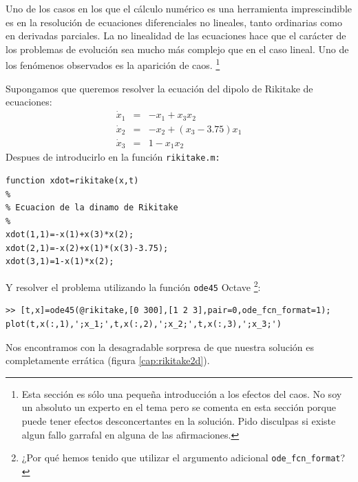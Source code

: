 Uno de los casos en los que el cálculo numérico es una herramienta
imprescindible es en la resolución de ecuaciones diferenciales no
lineales, tanto ordinarias como en derivadas parciales. La no
linealidad de las ecuaciones hace que el carácter de los problemas de
evolución sea mucho más complejo que en el caso lineal. Uno de los
fenómenos observados es la aparición de caos.%
\footnote{Esta sección es sólo una pequeña introducción a los efectos
  del caos.  No soy un absoluto un experto en el tema pero se comenta
  en esta sección porque puede tener efectos desconcertantes en la
  solución. Pido disculpas si existe algun fallo garrafal en alguna de
  las afirmaciones.%
}

Supongamos que queremos resolver la ecuación del dipolo de
Rikitake de ecuaciones:$$
\begin{array}{ccl}
  \dot x_{1} & = & -x_{1}+x_{3}x_{2}\\
  \dot x_{2} & = & -x_{2}+(x_{3}-3.75)x_{1}\\
  \dot x_{3} & = & 1-x_{1}x_{2}\end{array}$$
Despues de introducirlo en la función \texttt{rikitake.m:}

\begin{verbatim}
function xdot=rikitake(x,t)
%
% Ecuacion de la dinamo de Rikitake
%
xdot(1,1)=-x(1)+x(3)*x(2);
xdot(2,1)=-x(2)+x(1)*(x(3)-3.75);
xdot(3,1)=1-x(1)*x(2);
\end{verbatim}
Y resolver el problema utilizando la función \texttt{ode45} Octave%
\footnote{¿Por qué hemos tenido que utilizar el argumento adicional
  \texttt{ode\_fcn\_format}?%
}:

  \begin{verbatim}
>> [t,x]=ode45(@rikitake,[0 300],[1 2 3],pair=0,ode_fcn_format=1);
plot(t,x(:,1),';x_1;',t,x(:,2),';x_2;',t,x(:,3),';x_3;')
\end{verbatim}
Nos encontramos con la desagradable sorpresa de que nuestra solución
es completamente errática (figura \ref{cap:rikitake2d}).

